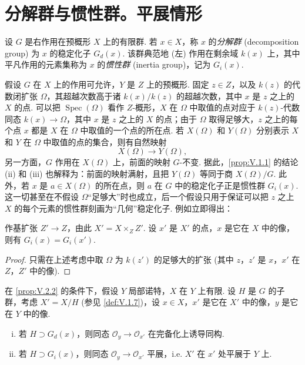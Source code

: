 \section{分解群与惯性群。平展情形}

设 $G$ 是右作用在预概形 $X$ 上的有限群. 若 $x \in X$，称 $x$ 的\emph{分解群} (decomposition group) 为 $x$ 的稳定化子 $G_d(x)$. 该群典范地 (左) 作用在剩余域 $k(x)$ 上，其中平凡作用的元素集称为 $x$ 的\emph{惯性群} (inertia group)，记为 $G_i(x)$.

假设 $G$ 在 $X$ 上的作用可允许，$Y$ 是 $Z$ 上的预概形. 固定 $z \in Z$，以及 $k(z)$ 的代数闭扩张 $\Omega$，其超越次数高于诸 $k(x)/k(z)$ 的超越次数，其中 $x$ 是 $z$ 之上的 $X$ 的点. 可以把 $\operatorname{Spec}(\Omega)$ 看作 $Z$-概形，$X$ 在 $\Omega$ 中取值的点对应于 $k(z)$-代数同态 $k(x) \to \Omega$，其中 $x$ 是 $z$ 之上的 $X$ 的点；由于 $\Omega$ 取得足够大，$z$ 之上的每个点 $x$ 都是 $X$ 在 $\Omega$ 中取值的一个点的所在点. 若 $X(\Omega)$ 和 $Y(\Omega)$ 分别表示 $X$ 和 $Y$ 在 $\Omega$ 中取值的点的集合，则有自然映射
\[
X(\Omega) \longrightarrow Y(\Omega),
\]
另一方面，$G$ 作用在 $X(\Omega)$ 上，前面的映射 $G$-不变. 据此，\ref{prop:V.1.1} 的结论 (ii) 和 (iii) 也解释为：前面的映射满射，且把 $Y(\Omega)$ 等同于商 $X(\Omega)/G$. 此外，若 $x$ 是 $a \in X(\Omega)$ 的所在点，则 $a$ 在 $G$ 中的稳定化子正是惯性群 $G_i(x)$. 这一切甚至在不假设 $\Omega$``足够大''时也成立，后一个假设只用于保证可以把 $z$ 之上 $X$ 的每个元素的惯性群刻画为``几何''稳定化子. 例如立即得出：

\begin{proposition}\label{prop:V.2.1}
作基扩张 $Z' \to Z$，由此 $X' = X \times_Z Z'$. 设 $x'$ 是 $X'$ 的点，$x$ 是它在 $X$ 中的像，则有 $G_i(x) = G_i(x')$.
\end{proposition}

\begin{proof}
只需在上述考虑中取 $\Omega$ 为 $k(z')$ 的足够大的扩张 (其中 $z$，$z'$ 是 $x$，$x'$ 在 $Z$，$Z'$ 中的像).
\end{proof}

\begin{proposition}\label{prop:V.2.2}
在 \ref{prop:V.2.2} 的条件下，假设 $Y$ 局部诺特，$X$ 在 $Y$ 上有限. 设 $H$ 是 $G$ 的子群，考虑 $X' = X/H$ (参见 \ref{def:V.1.7})，设 $x \in X$，$x'$ 是它在 $X'$ 中的像，$y$ 是它在 $Y$ 中的像.
\begin{enumerate}[(i)]
\item 若 $H \supset G_d(x)$，则同态 $\mathcal{O}_y \to \mathcal{O}_{x'}$ 在完备化上诱导同构.
\item 若 $H \supset G_i(x)$，则同态 $\mathcal{O}_y \to \mathcal{O}_{x'}$ 平展，i.e. $X'$ 在 $x'$ 处平展于 $Y$ 上.
\end{enumerate}
\end{proposition}

